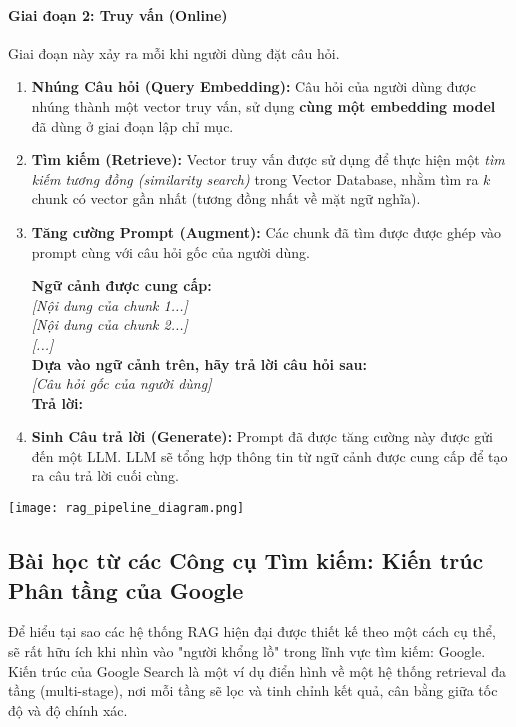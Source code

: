 \paragraph{Giai đoạn 2: Truy vấn (Online)}
Giai đoạn này xảy ra mỗi khi người dùng đặt câu hỏi.
\begin{enumerate}
    \item \textbf{Nhúng Câu hỏi (Query Embedding):} Câu hỏi của người dùng được nhúng thành một vector truy vấn, sử dụng \textbf{cùng một embedding model} đã dùng ở giai đoạn lập chỉ mục.
    \item \textbf{Tìm kiếm (Retrieve):} Vector truy vấn được sử dụng để thực hiện một \textit{tìm kiếm tương đồng (similarity search)} trong Vector Database, nhằm tìm ra $k$ chunk có vector gần nhất (tương đồng nhất về mặt ngữ nghĩa).
    \item \textbf{Tăng cường Prompt (Augment):} Các chunk đã tìm được được ghép vào prompt cùng với câu hỏi gốc của người dùng.
        \begin{tcolorbox}[colback=gray!5!white, colframe=gray!50!black, sharp corners]
        \textbf{Ngữ cảnh được cung cấp:} \\
        \textit{[Nội dung của chunk 1...]} \\
        \textit{[Nội dung của chunk 2...]} \\
        \textit{[...]} \\
        \textbf{Dựa vào ngữ cảnh trên, hãy trả lời câu hỏi sau:} \\
        \textit{[Câu hỏi gốc của người dùng]} \\
        \textbf{Trả lời:}
        \end{tcolorbox}
    \item \textbf{Sinh Câu trả lời (Generate):} Prompt đã được tăng cường này được gửi đến một LLM. LLM sẽ tổng hợp thông tin từ ngữ cảnh được cung cấp để tạo ra câu trả lời cuối cùng.
\end{enumerate}

\begin{center}
    \texttt{[image: rag\_pipeline\_diagram.png]}
    \label{fig:rag_pipeline_diagram}
\end{center}

\subsection{Bài học từ các Công cụ Tìm kiếm: Kiến trúc Phân tầng của Google}
\label{ssec:lesson_from_google}
Để hiểu tại sao các hệ thống RAG hiện đại được thiết kế theo một cách cụ thể, sẽ rất hữu ích khi nhìn vào "người khổng lồ" trong lĩnh vực tìm kiếm: Google. Kiến trúc của Google Search là một ví dụ điển hình về một hệ thống retrieval đa tầng (multi-stage), nơi mỗi tầng sẽ lọc và tinh chỉnh kết quả, cân bằng giữa tốc độ và độ chính xác.

